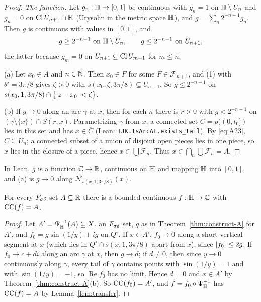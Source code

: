 \begin{proof}
\emph{The function.} Let $g_n:\mathbb{H}\to[0,1]$ be continuous with $g_n=1$ on $\mathbb{H}\setminus U_n$ and $g_n=0$ on
$\operatorname{Cl} U_{n+1}\cap\mathbb{H}$ (Urysohn in the metric space $\mathbb{H}$), and $g=\sum_n2^{-n-1}g_n$. Then $g$ is continuous with values in
$[0,1]$, and
\begin{equation}\label{eq:A23}
g\ge2^{-n-1}\text{ on }\mathbb{H}\setminus U_n,\qquad g\le2^{-n-1}\text{ on }U_{n+1},
\end{equation}
the latter because $g_m=0$ on $U_{n+1}\subseteq\operatorname{Cl} U_{m+1}$ for $m\le n$.

(a) Let $x_0\in A$ and $n\in\mathbb{N}$. Then $x_0\in F$ for some $F\in\mathcal F_{n+1}$, and (1) with $\theta'=3\pi/8$ gives $\zeta>0$
with $s(x_0,\zeta,3\pi/8)\subseteq U_{n+1}$. So $g\le2^{-n-1}$ on $s(x_0,1,3\pi/8)\cap\{\lvert z-x_0\rvert<\zeta\}$.

(b) If $g\to0$ along an arc $\gamma$ at $x$, then for each $n$ there is $r>0$ with $g<2^{-n-1}$ on
$(\gamma\setminus\{x\})\cap S(r,x)$. Parametrizing $\gamma$ from $x$, a connected set $C=p((0,t_0])$ lies in this set and has
$x\in\overline C$ (Lean: \texttt{TJK.IsArcAt.exists\_tail}). By \eqref{eq:A23}, $C\subseteq U_n$; a connected subset of a union of
disjoint open pieces lies in one piece, so $x$ lies in the closure of a piece, hence $x\in\bigcup\mathcal F_n$.
Thus $x\in\bigcap_n\bigcup\mathcal F_n=A$.
\end{proof}
In Lean, $g$ is a function $\mathbb{C}\to\mathbb{R}$, continuous on $\mathbb{H}$ and mapping $\mathbb{H}$ into $[0,1]$, and (a) is
$g\to0$ along $\mathcal N_{s(x,1,3\pi/8)}(x)$.

\begin{theorem}\label{thm:cc-realize}
For every $F_{\sigma\delta}$ set $A\subseteq\mathbb{R}$ there is a bounded continuous $f:\mathbb{H}\to\mathbb{C}$ with $\operatorname{CC}(f)=A$.
\end{theorem}
\begin{proof}
Let $A'=\Psi_{\mathbb{H}}^{-1}(A)\subseteq X$, an $F_{\sigma\delta}$ set, $g$ as in Theorem~\ref{thm:construct-A} for $A'$, and
$f_0=g\sin(1/y)+ig$ on $Q^\circ$. If $x\in A'$, $f_0\to0$ along a short vertical segment at $x$ (which lies in $Q^\circ\cap s(x,1,3\pi/8)$ apart from $x$),
since $\lvert f_0\rvert\le2g$.
If $f_0\to c+di$ along an arc $\gamma$ at $x$, then $g\to d$; if $d\ne0$, then since $y\to0$ continuously along
$\gamma$, every tail of $\gamma$ contains points with $\sin(1/y)=1$ and with $\sin(1/y)=-1$, so $\operatorname{Re}f_0$
has no limit. Hence $d=0$ and $x\in A'$ by Theorem~\ref{thm:construct-A}(b). So $\operatorname{CC}(f_0)=A'$, and
$f=f_0\circ\Psi_{\mathbb{H}}^{-1}$ has $\operatorname{CC}(f)=A$ by Lemma~\ref{lem:transfer}.
\end{proof}

